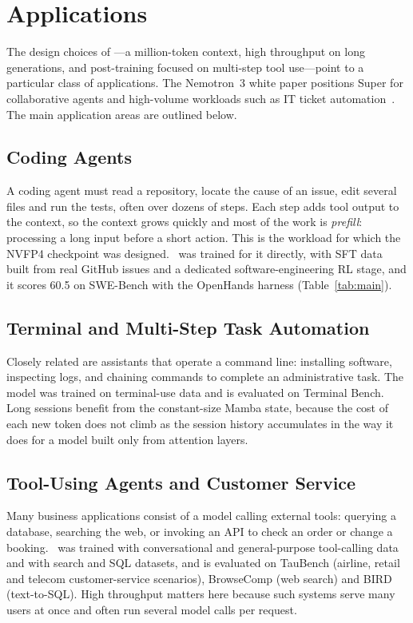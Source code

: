 \chapter{Applications}
\label{ch:apps}

The design choices of \NS---a million-token context, high throughput on long
generations, and post-training focused on multi-step tool use---point to a
particular class of applications. The Nemotron~3 white paper positions Super
for collaborative agents and high-volume workloads such as IT ticket
automation~\cite{nvidia2025nemotron3}. The main application areas are outlined
below.

\section{Coding Agents}

A coding agent must read a repository, locate the cause of an issue, edit
several files and run the tests, often over dozens of steps. Each step adds
tool output to the context, so the context grows quickly and most of the work
is \emph{prefill}: processing a long input before a short action. This is the
workload for which the NVFP4 checkpoint was designed. \NS\ was trained for it
directly, with SFT data built from real GitHub issues and a dedicated
software-engineering RL stage, and it scores 60.5 on SWE-Bench with the
OpenHands harness (Table~\ref{tab:main}).

\section{Terminal and Multi-Step Task Automation}

Closely related are assistants that operate a command line: installing
software, inspecting logs, and chaining commands to complete an administrative
task. The model was trained on terminal-use data and is evaluated on Terminal
Bench. Long sessions benefit from the constant-size Mamba state, because the
cost of each new token does not climb as the session history accumulates in
the way it does for a model built only from attention layers.

\section{Tool-Using Agents and Customer Service}

Many business applications consist of a model calling external tools: querying
a database, searching the web, or invoking an API to check an order or change
a booking. \NS\ was trained with conversational and general-purpose
tool-calling data and with search and SQL datasets, and is evaluated on
TauBench (airline, retail and telecom customer-service scenarios), BrowseComp
(web search) and BIRD (text-to-SQL). High throughput matters here because such
systems serve many users at once and often run several model calls per
request.

